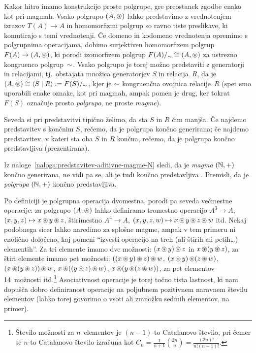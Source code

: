 Kakor hitro imamo konstrukcijo proste polgrupe, gre preostanek zgodbe enako kot pri magmah. Vsako polgrupo $(A, \mathop{\circledast}\nolimits)$ lahko predstavimo z vrednotenjem izrazov $T(A) \to A$ in homomorfizmi polgrup so ravno tiste preslikave, ki komutirajo s temi vrednotenji. Če domeno in kodomeno vrednotenja opremimo s polgrupnima operacijama, dobimo surjektiven homomorfizem polgrup $F(A) \to (A, \mathop{\circledast}\nolimits)$, ki porodi izomorfizem polgrup $F(A)/_\sim \cong (A, \mathop{\circledast}\nolimits)$ za ustrezno kongruenco polgrup~$\sim$. Vsako polgrupo je torej možno predstaviti z generatorji in relacijami, tj.~obstajata množica generatorjev $S$ in relacija~$R$, da je $(A, \oper) \ism \pres{S}{R} \dfeq F(S)/_\equ$, kjer je $\sim$ kongruenčna ovojnica relacije~$R$ (spet smo uporabili enake oznake, kot pri magmah, ampak pomen je drug, ker tokrat $F(S)$ označuje prosto \emph{polgrupo}, ne proste \emph{magme}).

Seveda si pri predstavitvi tipično želimo, da sta $S$ in $R$ čim manjša. Če najdemo predstavitev s končnim $S$, rečemo, da je polgrupa končno generirana; če najdemo predstavitev, v kateri sta oba $S$ in $R$ končna, rečemo, da je polgrupa končno predstavljiva (prezentirana).

\begin{naloga}\label{naloga:predstavitev-aditivne-polgrupe-N}
Iz naloge~\ref{naloga:predstavitev-aditivne-magme-N} sledi, da je \emph{magma} $(\mathbb{N}, +)$ končno generirana, ne vidi pa se, ali je tudi končno predstavljiva . Premisli, da je \emph{polgrupa} $(\mathbb{N}, +)$ končno predstavljiva.
\end{naloga}

Po definiciji je polgrupna operacija dvomestna, porodi pa seveda večmestne operacije: za polgrupo $(A, \mathop{\circledast}\nolimits)$ lahko definiramo tromestno operacijo $A^3 \to A$, $(x, y, z) \mapsto x \mathop{\circledast}\nolimits y \mathop{\circledast}\nolimits z$, štirimestno $A^4 \to A$, $(x, y, z, w) \mapsto x \mathop{\circledast}\nolimits y \mathop{\circledast}\nolimits z \mathop{\circledast}\nolimits w$ itd. Nekaj podobnega sicer lahko naredimo za splošne magme, ampak v tem primeru ni enolično določeno, kaj pomeni ``izvesti operacijo na treh (ali štirih ali petih\ldots) elementih''. Za tri elemente imamo dve možnosti: $(x \mathop{\circledast}\nolimits y) \mathop{\circledast}\nolimits z$ in $x \mathop{\circledast}\nolimits (y \mathop{\circledast}\nolimits z)$, za štiri elemente imamo pet možnosti: $((x \mathop{\circledast}\nolimits y) \mathop{\circledast}\nolimits z) \mathop{\circledast}\nolimits w$, $(x \mathop{\circledast}\nolimits y) \mathop{\circledast}\nolimits (z \mathop{\circledast}\nolimits w)$, $(x \mathop{\circledast}\nolimits (y \mathop{\circledast}\nolimits z)) \mathop{\circledast}\nolimits w$, $x \mathop{\circledast}\nolimits ((y \mathop{\circledast}\nolimits z) \mathop{\circledast}\nolimits w)$, $x \mathop{\circledast}\nolimits (y \mathop{\circledast}\nolimits (z \mathop{\circledast}\nolimits w))$, za pet elementov 14~možnosti itd.\footnote{Število možnosti za $n$~elementov je $(n-1)$-to Catalanovo število, pri čemer se $n$-to Catalanovo število izračuna kot $C_n = \frac{1}{n+1} \binom{2n}{n} = \frac{(2n)!}{n! (n+1)!}$.} Asociativnost operacije je torej točno tista lastnost, ki nam dopušča dobro definiranost operacije na poljubnem pozitivnem naravnem številu elementov (lahko torej govorimo o vsoti ali zmnožku sedmih elementov, na primer).

